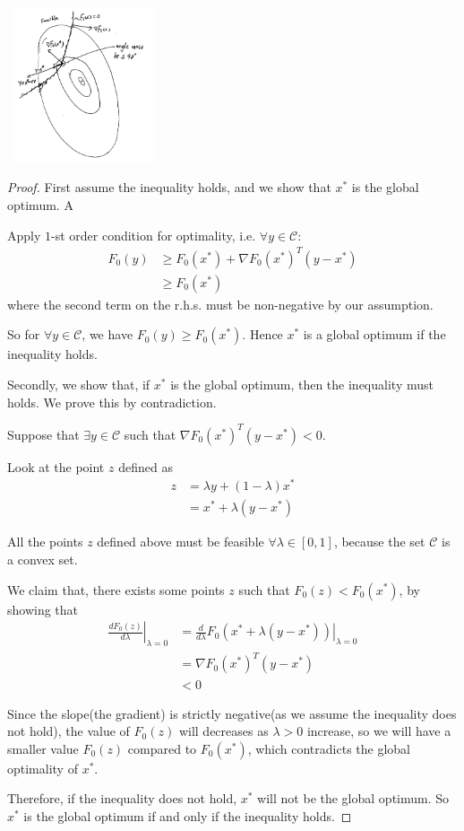 \begin{marginfigure}
\centering
\includegraphics[width=1.8in,height=1.8in]{figures/ch09/figure1113_1.png}
\end{marginfigure}

\begin{proof}
	First assume the inequality holds, and we show that $x^*$ is the global optimum. A
	
	Apply $1$-st order condition for optimality, i.e. $\forall y \in \mathcal{C}$:
	\begin{align*}
	F_0(y) &\geq F_0(x^*) + \nabla F_0(x^*)^T(y-x^*)\\
	&\geq F_0(x^*)
	\end{align*}
	where the second term on the r.h.s. must be non-negative by our assumption.
	
	So for $\forall y \in \mathcal{C}$, we have $F_0(y)\geq F_0(x^*)$. Hence $x^*$ is a global optimum if the inequality holds.
	
	Secondly, we show that, if $x^*$ is the global optimum, then the inequality must holds. We prove this by contradiction.
	
	Suppose that $\exists y\in \mathcal{C}$ such that $\nabla F_0(x^*)^T(y-x^*)<0$.
	
	Look at the point $z$ defined as
	\begin{align*}
	z 
	&= \lambda y + (1-\lambda)x^*\\
	&= x^* + \lambda(y-x^*)
	\end{align*}
	
	All the points $z$ defined above must be feasible $\forall \lambda \in [0,1]$, because the set $\mathcal{C}$ is a convex set.
	
	We claim that, there exists some points $z$ such that $F_0(z)<F_0(x^*)$, by showing that
	\begin{align*}
	\left.\frac{dF_0(z)}{d\lambda}\right|_{\lambda = 0} &=\left.\frac{d}{d\lambda}F_0(x^*+\lambda(y-x^*))\right|_{\lambda = 0}\\
	&= \nabla F_0(x^*)^T(y-x^*)\\
	&< 0
	\end{align*}
	
	Since the slope(the gradient) is strictly negative(as we assume the inequality does not hold), the value of $F_0(z)$ will decreases as $\lambda>0$ increase, so we will have a smaller value $F_0(z)$ compared to $F_0(x^*)$, which contradicts the global optimality of $x^*$.
	
	Therefore, if the inequality does not hold, $x^*$ will not be the global optimum. So $x^*$ is the global optimum if and only if the inequality holds.
\end{proof}


